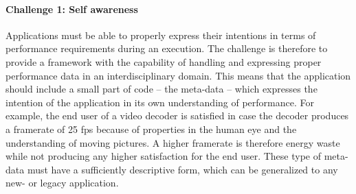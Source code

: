 \documentclass{article}
\begin{document}
\paragraph{Challenge 1: Self awareness}
\label{sec:self}
Applications must be able to properly express their intentions in terms of performance requirements during an execution. 
The challenge is therefore to provide a framework with the capability of handling and expressing proper performance data in an interdisciplinary domain.
This means that the application should include a small part of code -- the meta-data -- which expresses the intention of the application in its own understanding of performance.
For example, the end user of a video decoder is satisfied in case the decoder produces a framerate of 25 fps because of properties in the human eye and the understanding of moving pictures. 
A higher framerate is therefore energy waste while not producing any higher satisfaction for the end user.
These type of meta-data must have a sufficiently descriptive form, which can be generalized to any new- or legacy application.
\end{document}
